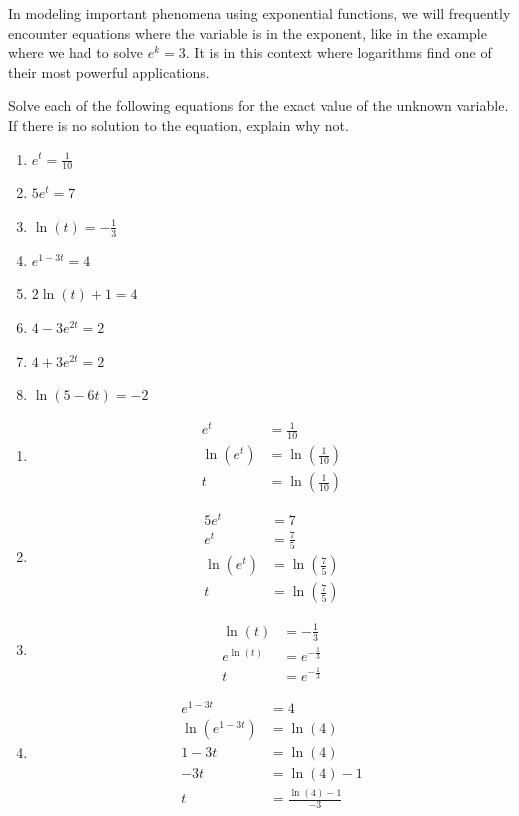 \documentclass[nooutcomes]{ximera}
\begin{document}
In modeling important phenomena using exponential functions, we will frequently encounter equations where the variable is in the exponent, like in the example where we had to solve \(e^k = 3\).  It is in this context where logarithms find one of their most powerful applications.  
\begin{example}
Solve each of the following equations for the exact value of the unknown variable.  If there is no solution to the equation, explain why not.%

\begin{enumerate}[label=\alph*.]
\item
\(e^t = \frac{1}{10}\)%
\item
\(5e^{t}=7\)%
\item
\(\ln(t) = -\frac{1}{3}\)%
\item
\(e^{1-3t} = 4\)%
\item
\(2\ln(t) + 1 = 4\)%
\item
\(4 - 3e^{2t} = 2\)%
\item
\(4 + 3e^{2t} = 2\)%
\item
\(\ln(5 - 6t) = -2\)%
\end{enumerate}
\begin{explanation}
\begin{enumerate}[label=\alph*.]
\item
\begin{align*}
e^t &= \frac{1}{10}\\
\ln(e^t) &= \ln{\left(\frac{1}{10}\right)}\\
t&=\ln{\left(\frac{1}{10}\right)}
\end{align*}
\item
\begin{align*}
5e^{t}&=7\\
e^{t}&=\frac{7}{5}\\
\ln{(e^{t})}&=\ln{\left(\frac{7}{5}\right)}\\
t &=\ln{\left(\frac{7}{5}\right)}
\end{align*}
\item
\begin{align*}
\ln(t) &= -\frac{1}{3}\\
e^{\ln(t)} &=e^{-\frac{1}{3}}\\
t &=e^{-\frac{1}{3}}
\end{align*}
\item

\begin{align*}
e^{1-3t} &= 4\\
\ln(e^{1-3t}) &= \ln(4)\\
1-3t &= \ln(4)\\
-3t &= \ln(4)-1\\
t &= \frac{\ln(4)-1}{-3}
\end{align*}


\end{enumerate}
\end{explanation}
\end{example}
\end{document}
